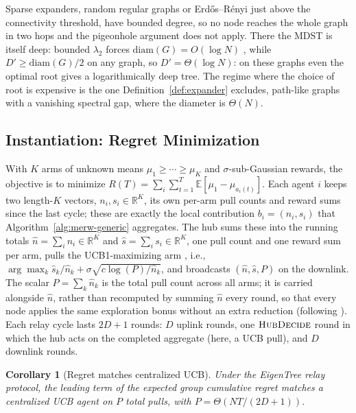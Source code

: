 \documentclass[letterpaper]{article} %
\newtheorem{corollary}{Corollary}
\begin{document}
Sparse expanders, random regular graphs or Erd\H{o}s--R\'{e}nyi just above the
connectivity threshold, have bounded degree, so no node reaches the whole graph
in two hops and the pigeonhole argument does not apply. There the MDST is
itself deep: bounded $\lambda_2$ forces $\mathrm{diam}(G) = O(\log N)$
\citep{mohar1991}, while $D' \geq \mathrm{diam}(G)/2$ on any graph, so $D' =
\Theta(\log N)$: on these graphs even the optimal root gives a logarithmically
deep tree. The regime where the choice of root is expensive is the one
Definition~\ref{def:expander} excludes, path-like graphs with a vanishing
spectral gap, where the diameter is $\Theta(N)$.

\subsection{Instantiation: Regret Minimization}
\label{sec:regret}

With $K$ arms of unknown means $\mu_1 \geq \cdots \geq \mu_K$ and
$\sigma$-sub-Gaussian rewards, the objective is to minimize $R(T) =
\sum_{i}\sum_{t=1}^T \mathbb{E}[\mu_1 - \mu_{a_i(t)}]$. Each agent $i$ keeps
two length-$K$ vectors, $n_i, s_i \in \mathbb{R}^K$, its own per-arm pull
counts and reward sums since the last cycle; these are exactly the local
contribution $b_i = (n_i, s_i)$ that Algorithm~\ref{alg:merw-generic}
aggregates. The hub sums these into the running totals $\hat n = \sum_i n_i \in
\mathbb{R}^K$ and $\hat s = \sum_i s_i \in \mathbb{R}^K$, one pull count and
one reward sum per arm, pulls the UCB1-maximizing arm \citep{auer2002}, i.e.,
$\arg\max_k \hat s_k/\hat n_k + \sigma\sqrt{c\log(P)/\hat n_k}$, and broadcasts
$(\hat n, \hat s, P)$ on the downlink. The scalar $P = \sum_k \hat n_k$ is the
total pull count across all arms; it is carried alongside $\hat n$, rather than
recomputed by summing $\hat n$ every round, so that every node applies the same
exploration bonus without an extra reduction (following
\citep{martinez2019decentralized}). Each relay cycle lasts $2D+1$ rounds: $D$
uplink rounds, one $\textsc{HubDecide}$ round in which the hub acts on the completed
aggregate (here, a UCB pull), and $D$ downlink rounds.

\begin{corollary}[Regret matches centralized UCB]
\label{cor:regret}
Under the EigenTree relay protocol, the leading term of the expected group
	cumulative regret matches a centralized UCB agent on $P$ total pulls, with
	$P = \Theta(NT/(2D+1))$.
\end{corollary}
\end{document}
